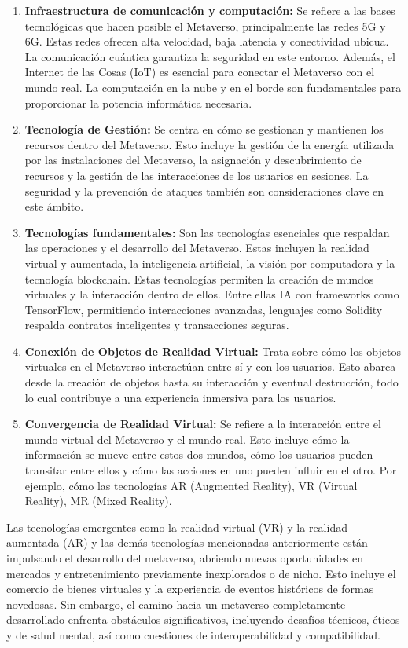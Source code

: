 \documentclass[a4paper,10pt]{article}
\begin{document}
	\begin{enumerate}
		\item \textbf{Infraestructura de comunicación y computación:} Se refiere a las bases tecnológicas que hacen posible el Metaverso, principalmente las redes 5G y 6G. Estas redes ofrecen alta velocidad, baja latencia y conectividad ubicua. La comunicación cuántica garantiza la seguridad en este entorno. Además, el Internet de las Cosas (IoT) es esencial para conectar el Metaverso con el mundo real. La computación en la nube y en el borde son fundamentales para proporcionar la potencia informática necesaria.
		\item \textbf{Tecnología de Gestión:} Se centra en cómo se gestionan y mantienen los recursos dentro del Metaverso. Esto incluye la gestión de la energía utilizada por las instalaciones del Metaverso, la asignación y descubrimiento de recursos y la gestión de las interacciones de los usuarios en sesiones. La seguridad y la prevención de ataques también son consideraciones clave en este ámbito.
		\item \textbf{Tecnologías fundamentales:} Son las tecnologías esenciales que respaldan las operaciones y el desarrollo del Metaverso. Estas incluyen la realidad virtual y aumentada, la inteligencia artificial, la visión por computadora y la tecnología blockchain. Estas tecnologías permiten la creación de mundos virtuales y la interacción dentro de ellos. Entre ellas IA con frameworks como TensorFlow, permitiendo interacciones avanzadas, lenguajes como Solidity respalda contratos inteligentes y transacciones seguras.
		\item \textbf{Conexión de Objetos de Realidad Virtual:} Trata sobre cómo los objetos virtuales en el Metaverso interactúan entre sí y con los usuarios. Esto abarca desde la creación de objetos hasta su interacción y eventual destrucción, todo lo cual contribuye a una experiencia inmersiva para los usuarios.
		\item \textbf{Convergencia de Realidad Virtual:} Se refiere a la interacción entre el mundo virtual del Metaverso y el mundo real. Esto incluye cómo la información se mueve entre estos dos mundos, cómo los usuarios pueden transitar entre ellos y cómo las acciones en uno pueden influir en el otro. Por ejemplo, cómo las tecnologías AR (Augmented Reality), VR (Virtual Reality), MR (Mixed Reality).
	\end{enumerate}
	Las tecnologías emergentes como la realidad virtual (VR) y la realidad aumentada (AR) y las demás tecnologías mencionadas anteriormente están impulsando el desarrollo del metaverso, abriendo nuevas oportunidades en mercados y entretenimiento previamente inexplorados o de nicho. Esto incluye el comercio de bienes virtuales y la experiencia de eventos históricos de formas novedosas. 
	Sin embargo, el camino hacia un metaverso completamente desarrollado enfrenta obstáculos significativos, incluyendo desafíos técnicos, éticos y de salud mental, así como cuestiones de interoperabilidad y compatibilidad.
	
\end{document}
